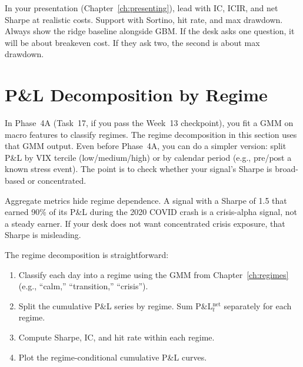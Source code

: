 \begin{keyidea}
In your presentation (Chapter~\ref{ch:presenting}), lead with IC, ICIR, and net Sharpe at realistic costs.  Support with Sortino, hit rate, and max drawdown.  Always show the ridge baseline alongside GBM.  If the desk asks one question, it will be about breakeven cost.  If they ask two, the second is about max drawdown.
\end{keyidea}


\section{P\&L Decomposition by Regime}
\label{sec:pnl-regime}

\begin{projectconnection}
In Phase~4A (Task~17, if you pass the Week~13 checkpoint), you fit a GMM on macro features to classify regimes.  The regime decomposition in this section uses that GMM output.  Even before Phase~4A, you can do a simpler version: split P\&L by VIX tercile (low/medium/high) or by calendar period (e.g., pre/post a known stress event).  The point is to check whether your signal's Sharpe is broad-based or concentrated.
\end{projectconnection}

Aggregate metrics hide regime dependence.  A signal with a Sharpe of 1.5 that earned 90\% of its P\&L during the 2020 COVID crash is a crisis-alpha signal, not a steady earner.  If your desk does not want concentrated crisis exposure, that Sharpe is misleading.

The regime decomposition is straightforward:

\begin{enumerate}[nosep]
  \item Classify each day into a regime using the GMM from Chapter~\ref{ch:regimes} (e.g., ``calm,'' ``transition,'' ``crisis'').
  \item Split the cumulative P\&L series by regime.  Sum P\&L$_t^{\text{net}}$ separately for each regime.
  \item Compute Sharpe, IC, and hit rate within each regime.
  \item Plot the regime-conditional cumulative P\&L curves.
\end{enumerate}

